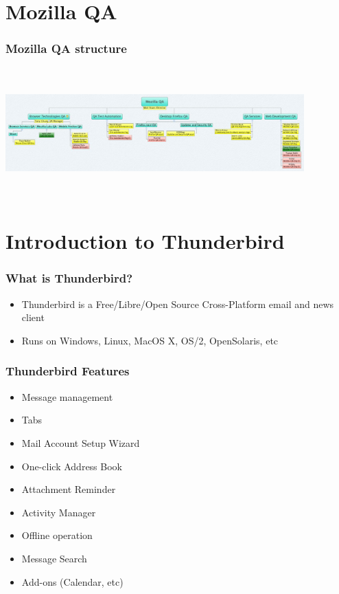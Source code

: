 \documentclass{beamer}
\begin{document}
\section{Mozilla QA}

\begin{frame}
\frametitle{Mozilla QA structure}
\begin{center}
 \includegraphics[height=5cm,width=11.5cm]{figs/MozillaQAOrgPic.jpg}
\begin{figure}
\end{figure}
\end{center}
\end{frame}



\section{Introduction to Thunderbird}


\begin{frame}
\frametitle{What is Thunderbird?}
 \begin{itemize}
 \item Thunderbird is a Free/Libre/Open Source Cross-Platform email and news client
 \item Runs on Windows, Linux, MacOS X, OS/2, OpenSolaris, etc
 \end{itemize}
\end{frame}



\begin{frame}
 \frametitle{Thunderbird Features}
 \begin{itemize}
 \item Message management
 \item Tabs
 \item Mail Account Setup Wizard
 \item One-click Address Book
 \item Attachment Reminder
 \item Activity Manager
 \item Offline operation
 \item Message Search
 \item Add-ons (Calendar, etc)
 \end{itemize}
\end{frame}
\end{document}
